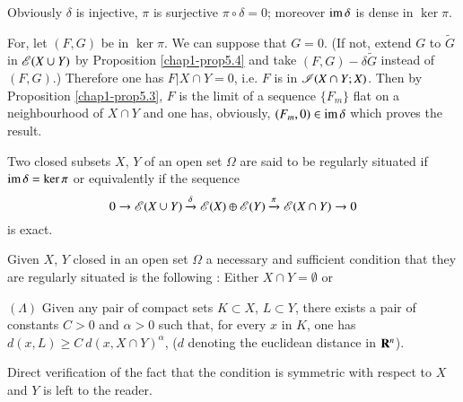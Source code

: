 Obviously $\delta$ is injective, $\pi$ is surjective $\pi\circ \delta=0$; moreover $\operatorname{im} \delta$ is dense in $\ker \pi$.

For, let $(F,G)$ be in $\ker \pi$. We can suppose that $G=0$. (If not, extend $G$ to $\widetilde{G}$ in $\mathscr{E}(X\cup Y)$ by Proposition \ref{chap1-prop5.4} and take $(F,G)-\delta\widetilde{G}$ instead of $(F,G)$.) Therefore one has $F|X\cap Y=0$, i.e. $F$ is in $\mathscr{I}(X\cap Y;X)$. Then by Proposition \ref{chap1-prop5.3}, $F$ is the limit of a sequence $\{F_{m}\}$ flat on a neighbourhood of $X\cap Y$ and one has, obviously, $(F_{m},0)\in \operatorname{im} \delta$ which proves the result.

\begin{definition}\label{chap1-defi5.4}
Two closed subsets $X$, $Y$ of an open set $\Omega$ are said to be regularly situated if $\operatorname{im} \delta=\ker \pi$ or equivalently if the sequence
$$
0\to \mathscr{E}(X\cup Y)\xrightarrow{\delta}\mathscr{E}(X)\oplus \mathscr{E}(Y)\xrightarrow{\pi}\mathscr{E}(X\cap Y)\to 0
$$
is exact.
\end{definition}

\begin{theorem}[{\L}ojasiewicz {[1]}]\label{chap1-thm5.5}
Given $X$, $Y$ closed in an open set $\Omega$ a necessary and sufficient condition that they are regularly situated is the following : Either $X\cap Y=\emptyset$ or

$(\Lambda)$ Given any pair of compact sets $K\subset X$, $L\subset Y$, there exists a pair of constants $C>0$ and $\alpha>0$ such that, for every $x$ in $K$, one has $d(x,L)\geq C \ d(x,X\cap Y)^{\alpha}$, ($d$ denoting the euclidean distance in $\mathbf{R}^{n}$).
\end{theorem}

Direct verification of the fact that the condition is symmetric with respect to $X$ and $Y$ is left to the reader.

